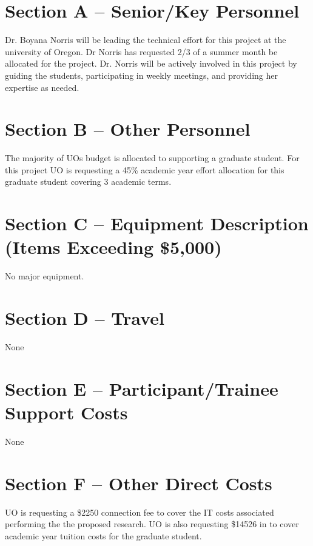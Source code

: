 

\section{Section A -- Senior/Key Personnel}
Dr. Boyana Norris will be leading the technical effort for this project at the university 
of Oregon. Dr Norris has requested 2/3 of a summer month be allocated for the project.  
Dr. Norris will be actively involved in this project by guiding the students,
participating in weekly meetings, and providing her expertise as needed.

\section{Section B -- Other Personnel}
The majority of UOs budget is allocated to supporting a graduate student. For this project UO is 
requesting a 45\% academic year effort allocation for this graduate student covering 3 academic 
terms. 


\section{Section C -- Equipment Description (Items Exceeding \$5,000)}
No major equipment.

\section{Section D -- Travel}
None

\section{Section E -- Participant/Trainee Support Costs}
None

\section{Section F -- Other Direct Costs}
UO is requesting a \$2250 connection fee to cover the IT costs associated performing 
the the proposed research. UO is also requesting  \$14526 in to cover academic year tuition costs for the graduate student. 
